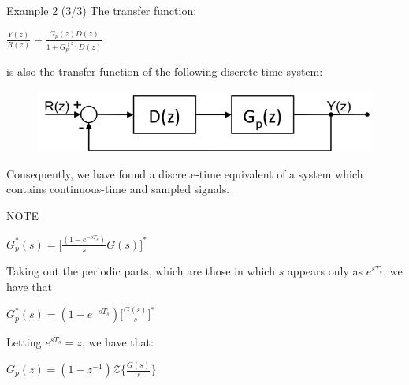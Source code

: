 \begin{frame}
	\begin{exampleblock}{Example 2 (3/3)}
		\justify		
		The transfer function:
		\begin{center}
			$\frac{Y(z)}{R(z)} = \frac{G_p(z)D(z)}{1 +  G_p^(z)D(z)}$
		\end{center}
		is also the transfer function of the following discrete-time system:
		\begin{figure}
			\centering
			\includegraphics[width=0.8\linewidth]{block_analysis_3}
		\end{figure}
		Consequently, we have found a discrete-time equivalent of a system which contains continuous-time and sampled signals.
	\end{exampleblock}
\end{frame}

\begin{frame}
	\begin{alertblock}{NOTE}
	\begin{center}
		$G_p^{*}(s) = \big[ \frac{(1 - e^{-sT_s})}{s} G(s) \big]^{*}$
	\end{center}
	Taking out the periodic parts, which are those in which $s$ appears only as $e^{sT_s}$, we have that
	\begin{center}
		$G_p^{*}(s) = (1 - e^{-sT_s}) \big[ \frac{G(s)}{s} \big]^{*}$
	\end{center}
	Letting $e^{sT_s} = z$, we have that:
	\begin{center}
		$G_p(z) = (1-z^{-1}) \mathcal{Z} \big\{ \frac{G(s)}{s} \big\}$
	\end{center}
	\end{alertblock}
\end{frame}
